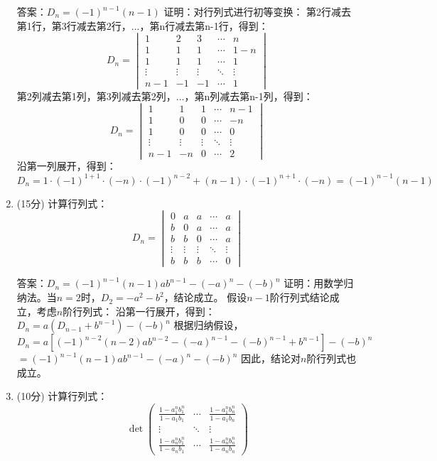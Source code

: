\documentclass[a4paper,12pt]{article}
\begin{document}
\begin{enumerate}[leftmargin=*]
    答案：$D_n = (-1)^{n-1}(n-1)$
    证明：对行列式进行初等变换：
    第2行减去第1行，第3行减去第2行，...，第n行减去第n-1行，得到：
    \[
    D_n = \begin{vmatrix}
    1 & 2 & 3 & \cdots & n \\
    1 & 1 & 1 & \cdots & 1-n \\
    1 & 1 & 1 & \cdots & 1 \\
    \vdots & \vdots & \vdots & \ddots & \vdots \\
    n-1 & -1 & -1 & \cdots & 1
    \end{vmatrix}
    \]
    第2列减去第1列，第3列减去第2列，...，第n列减去第n-1列，得到：
    \[
    D_n = \begin{vmatrix}
    1 & 1 & 1 & \cdots & n-1 \\
    1 & 0 & 0 & \cdots & -n \\
    1 & 0 & 0 & \cdots & 0 \\
    \vdots & \vdots & \vdots & \ddots & \vdots \\
    n-1 & -n & 0 & \cdots & 2
    \end{vmatrix}
    \]
    沿第一列展开，得到：
    $D_n = 1 \cdot (-1)^{1+1} \cdot (-n) \cdot (-1)^{n-2} + (n-1) \cdot (-1)^{n+1} \cdot (-n) = (-1)^{n-1}(n-1)$
    
    \item (15分) 计算行列式：
    \[
    D_n = \begin{vmatrix}
    0 & a & a & \cdots & a \\
    b & 0 & a & \cdots & a \\
    b & b & 0 & \cdots & a \\
    \vdots & \vdots & \vdots & \ddots & \vdots \\
    b & b & b & \cdots & 0
    \end{vmatrix}
    \]
    
    答案：$D_n = (-1)^{n-1}(n-1)ab^{n-1} - (-a)^n - (-b)^n$
    证明：用数学归纳法。当$n=2$时，$D_2 = -a^2-b^2$，结论成立。
    假设$n-1$阶行列式结论成立，考虑$n$阶行列式：
    沿第一行展开，得到：
    $D_n = a(D_{n-1} + b^{n-1}) - (-b)^n$
    根据归纳假设，
    $D_n = a[(-1)^{n-2}(n-2)ab^{n-2} - (-a)^{n-1} - (-b)^{n-1} + b^{n-1}] - (-b)^n$
    $= (-1)^{n-1}(n-1)ab^{n-1} - (-a)^n - (-b)^n$
    因此，结论对$n$阶行列式也成立。
    
    \item (10分) 计算行列式：
    \[
    \det\begin{pmatrix}
    \frac{1-a_1^nb_1^n}{1-a_1b_1} & \cdots & \frac{1-a_1^nb_n^n}{1-a_1b_n} \\
    \vdots & \ddots & \vdots \\
    \frac{1-a_n^nb_1^n}{1-a_nb_1} & \cdots & \frac{1-a_n^nb_n^n}{1-a_nb_n}
    \end{pmatrix}
    \]
    

\end{enumerate}
\end{document}
